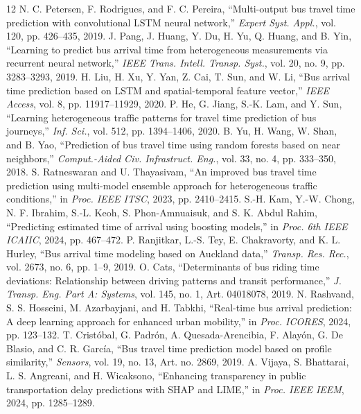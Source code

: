 \documentclass[conference]{IEEEtran}
\begin{document}
\begin{thebibliography}{12}
 N. C. Petersen, F. Rodrigues, and F. C. Pereira, ``Multi-output bus travel time prediction with convolutional LSTM neural network,'' \emph{Expert Syst. Appl.}, vol. 120, pp. 426--435, 2019.
 J. Pang, J. Huang, Y. Du, H. Yu, Q. Huang, and B. Yin, ``Learning to predict bus arrival time from heterogeneous measurements via recurrent neural network,'' \emph{IEEE Trans. Intell. Transp. Syst.}, vol. 20, no. 9, pp. 3283--3293, 2019.
 H. Liu, H. Xu, Y. Yan, Z. Cai, T. Sun, and W. Li, ``Bus arrival time prediction based on LSTM and spatial-temporal feature vector,'' \emph{IEEE Access}, vol. 8, pp. 11917--11929, 2020.
 P. He, G. Jiang, S.-K. Lam, and Y. Sun, ``Learning heterogeneous traffic patterns for travel time prediction of bus journeys,'' \emph{Inf. Sci.}, vol. 512, pp. 1394--1406, 2020.
 B. Yu, H. Wang, W. Shan, and B. Yao, ``Prediction of bus travel time using random forests based on near neighbors,'' \emph{Comput.-Aided Civ. Infrastruct. Eng.}, vol. 33, no. 4, pp. 333--350, 2018.
 S. Ratneswaran and U. Thayasivam, ``An improved bus travel time prediction using multi-model ensemble approach for heterogeneous traffic conditions,'' in \emph{Proc. IEEE ITSC}, 2023, pp. 2410--2415.
 S.-H. Kam, Y.-W. Chong, N. F. Ibrahim, S.-L. Keoh, S. Phon-Amnuaisuk, and S. K. Abdul Rahim, ``Predicting estimated time of arrival using boosting models,'' in \emph{Proc. 6th IEEE ICAIIC}, 2024, pp. 467--472.
 P. Ranjitkar, L.-S. Tey, E. Chakravorty, and K. L. Hurley, ``Bus arrival time modeling based on Auckland data,'' \emph{Transp. Res. Rec.}, vol. 2673, no. 6, pp. 1--9, 2019.
 O. Cats, ``Determinants of bus riding time deviations: Relationship between driving patterns and transit performance,'' \emph{J. Transp. Eng. Part A: Systems}, vol. 145, no. 1, Art. 04018078, 2019.
 N. Rashvand, S. S. Hosseini, M. Azarbayjani, and H. Tabkhi, ``Real-time bus arrival prediction: A deep learning approach for enhanced urban mobility,'' in \emph{Proc. ICORES}, 2024, pp. 123--132.
 T. Cristóbal, G. Padrón, A. Quesada-Arencibia, F. Alayón, G. De Blasio, and C. R. García, ``Bus travel time prediction model based on profile similarity,'' \emph{Sensors}, vol. 19, no. 13, Art. no. 2869, 2019.
 A. Vijaya, S. Bhattarai, L. S. Angreani, and H. Wicaksono, ``Enhancing transparency in public transportation delay predictions with SHAP and LIME,'' in \emph{Proc. IEEE IEEM}, 2024, pp. 1285--1289.
\end{thebibliography}
\end{document}
